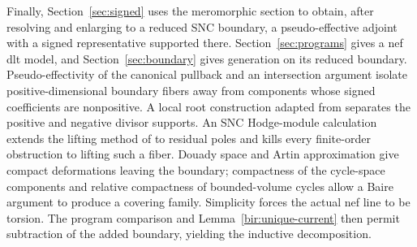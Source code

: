 Finally, Section~\ref{sec:signed} uses the meromorphic section to obtain,
after resolving and enlarging to a reduced SNC boundary, a pseudo-effective
adjoint with a signed representative supported there.
Section~\ref{sec:programs} gives a nef dlt model, and
Section~\ref{sec:boundary} gives generation on its reduced boundary.
Pseudo-effectivity of the canonical pullback and an intersection argument
isolate positive-dimensional boundary fibers away from components whose
signed coefficients are nonpositive. A local root construction adapted from
\cite[Proposition~3.3]{LI} separates the positive and negative divisor
supports. An SNC Hodge-module calculation extends the lifting method of
\cite[Sections~10--12]{BL} to residual poles and kills every finite-order
obstruction to lifting such a fiber. Douady space and Artin approximation
give compact deformations leaving the boundary; compactness of the cycle-space
components and relative compactness of bounded-volume cycles allow a Baire
argument to produce a covering family. Simplicity
forces the actual nef line to be torsion. The program comparison and
Lemma~\ref{bir:unique-current} then permit subtraction of the added boundary,
yielding the inductive decomposition.
